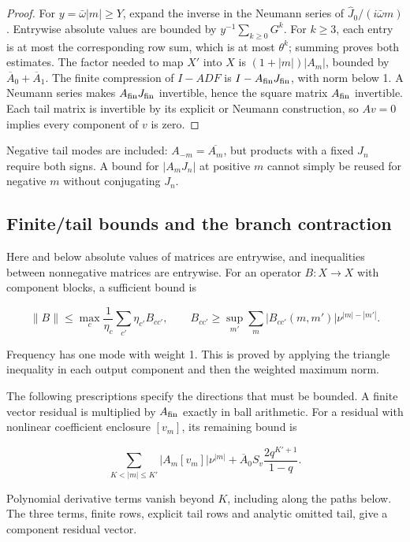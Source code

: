 \documentclass[11pt]{article}
\theoremstyle{definition}
\begin{document}
\begin{proof} For $y=\bar\omega|m|\ge Y$, expand the inverse in the Neumann series of $\widehat J_0/(i\bar\omega m)$. Entrywise absolute values are bounded by $y^{-1}\sum_{k\ge0}G^k$. For $k\ge3$, each entry is at most the corresponding row sum, which is at most $\theta^k$; summing proves both estimates. The factor needed to map $X'$ into $X$ is $(1+|m|)|A_m|$, bounded by $\overline A_0+\overline A_1$. The finite compression of $I-A DF$ is $I-A_{\rm fin}J_{\rm fin}$, with norm below 1. A Neumann series makes $A_{\rm fin}J_{\rm fin}$ invertible, hence the square matrix $A_{\rm fin}$ invertible. Each tail matrix is invertible by its explicit or Neumann construction, so $Av=0$ implies every component of $v$ is zero. \end{proof}

Negative tail modes are included: $A_{-m}=\overline{A_m}$, but products with a fixed $J_n$ require both signs. A bound for $|A_mJ_n|$ at positive $m$ cannot simply be reused for negative $m$ without conjugating $J_n$.

\subsection{Finite/tail bounds and the branch contraction}\label{sec:cg-3}

Here and below absolute values of matrices are entrywise, and inequalities between nonnegative matrices are entrywise. For an operator $B:X\to X$ with component blocks, a sufficient bound is

\[
 \|B\|\le\max_c\frac1{\eta_c}\sum_{c'}\eta_{c'} B_{cc'},\qquad
 B_{cc'}\ge\sup_{m'}\sum_m|B_{cc'}(m,m')|
                         \nu^{|m|-|m'|}.
\]

Frequency has one mode with weight 1. This is proved by applying the triangle inequality in each output component and then the weighted maximum norm.

The following prescriptions specify the directions that must be bounded. A finite vector residual is multiplied by $A_{\rm fin}$ exactly in ball arithmetic. For a residual with nonlinear coefficient enclosure $[v_m]$, its remaining bound is

\[
 \sum_{K<|m|\le K'}|A_m[v_m]|\nu^{|m|}
 +\overline A_0 S_v\frac{2q^{K'+1}}{1-q}.
\]

Polynomial derivative terms vanish beyond $K$, including along the paths below. The three terms, finite rows, explicit tail rows and analytic omitted tail, give a component residual vector.
\end{document}
